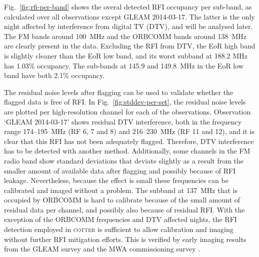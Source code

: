 \documentclass{pasa}
\begin{document}
Fig.~\ref{fig:rfi-per-band} shows the overal detected RFI occupancy per sub-band, as calculated over all observations except GLEAM 2014-03-17. The latter is the only night affected by interference from digital TV (DTV), and will be analysed later. The FM bands around 100~MHz and the ORBCOMM bands around 138~MHz are clearly present in the data. Excluding the RFI from DTV, the EoR high band is slightly cleaner than the EoR low band, and its worst subband at 188.2 MHz has 1.03\% occupancy. The sub-bands at 145.9 and 149.8~MHz in the EoR low band have both 2.1\% occupancy.

The residual noise levels after flagging can be used to validate whether the flagged data is free of RFI. In Fig.~\ref{fig:stddev-per-set}, the residual noise levels are plotted per high-resolution channel for each of the observations. Observation `GLEAM 2014-03-17' shows residual DTV interference, both in the frequency range 174--195~MHz (RF 6, 7 and 8) and 216--230~MHz (RF 11 and 12), and it is clear that this RFI has not been adequately flagged. Therefore, DTV interference has to be detected with another method. Additionally, some channels in the FM radio band show standard deviations that deviate slightly as a result from the smaller amount of available data after flagging and possibly because of RFI leakage. Nevertheless, because the effect is small these frequencies can be calibrated and imaged without a problem. The subband at 137~MHz that is occupied by ORBCOMM is hard to calibrate because of the small amount of residual data per channel, and possibly also because of residual RFI. With the exception of the ORBCOMM frequencies and DTV affected nights, the RFI detection employed in \textsc{cotter} is sufficient to allow calibration and imaging without further RFI mitigation efforts. This is verified by early imaging results from the GLEAM survey and the MWA commissioning survey \citep{mwacs-2014}.
\end{document}
